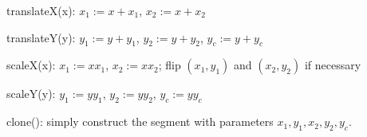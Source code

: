 \documentclass{article}
\begin{document}
translateX(x): $x_1:=x+x_1$, $x_2:=x+x_2$

translateY(y): $y_1:=y+y_1$, $y_2:=y+y_2$, $y_c:=y+y_c$

scaleX(x): $x_1:=xx_1$, $x_2:=xx_2$; flip $(x_1, y_1)$ and $(x_2, y_2)$ if necessary

scaleY(y): $y_1:=yy_1$, $y_2:=yy_2$, $y_c:=yy_c$

clone(): simply construct the segment with parameters $x_1, y_1, x_2, y_2, y_c$.

















\end{document}
